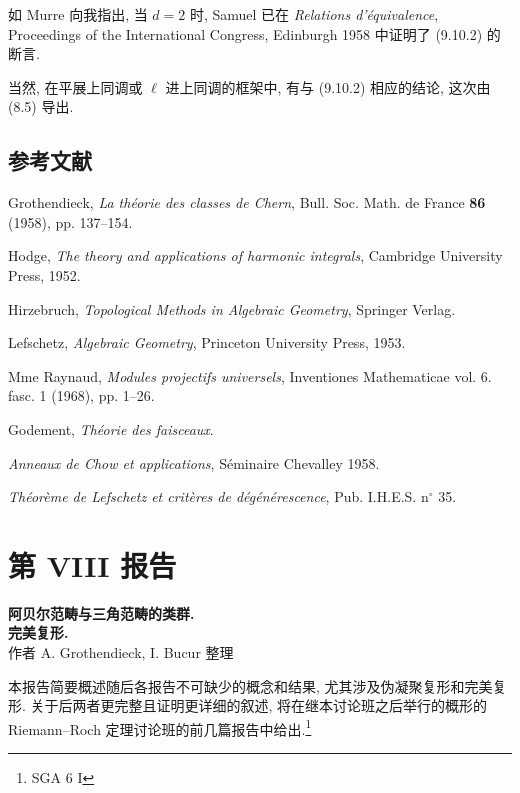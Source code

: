 如 Murre 向我指出, 当 $d=2$ 时, Samuel 已在 \emph{Relations d'équivalence}, Proceedings of the International Congress, Edinburgh 1958 中证明了 (9.10.2) 的断言.

当然, 在平展上同调或 $\ell$ 进上同调的框架中, 有与 (9.10.2) 相应的结论, 这次由 (8.5) 导出.

\subsection*{参考文献}

\begin{enumerate}[label={[\arabic*]}]
\item Grothendieck, \emph{La théorie des classes de Chern}, Bull. Soc. Math. de France \textbf{86} (1958), pp. 137--154.
\item Hodge, \emph{The theory and applications of harmonic integrals}, Cambridge University Press, 1952.
\item Hirzebruch, \emph{Topological Methods in Algebraic Geometry}, Springer Verlag.
\item Lefschetz, \emph{Algebraic Geometry}, Princeton University Press, 1953.
\item Mme Raynaud, \emph{Modules projectifs universels}, Inventiones Mathematicae vol. 6. fasc. 1 (1968), pp. 1--26.
\item[{[TF]}] Godement, \emph{Théorie des faisceaux}.
\item[{[CH]}] \emph{Anneaux de Chow et applications}, Séminaire Chevalley 1958.
\item[{[6]}] \emph{Théorème de Lefschetz et critères de dégénérescence}, Pub. I.H.E.S. n$^\circ$ 35.
\end{enumerate}


\newpage
{}
\section*{第 VIII 报告}

\begin{center}
\textbf{阿贝尔范畴与三角范畴的类群.}\\
\textbf{完美复形.}\\[1ex]
作者 A. Grothendieck, I. Bucur 整理
\end{center}

本报告简要概述随后各报告不可缺少的概念和结果, 尤其涉及伪凝聚复形和完美复形. 关于后两者更完整且证明更详细的叙述, 将在继本讨论班之后举行的概形的 Riemann--Roch 定理讨论班的前几篇报告中给出.\footnote{SGA 6 I}


